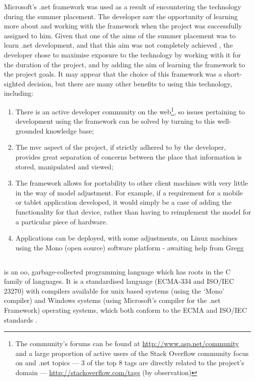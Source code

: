 Microsoft's .\gls{net} framework was used as a result of encountering the technology during the summer placement.  The developer saw the opportunity of learning more about and working with the framework when the project was successfully assigned to him.  Given that one of the aims of the summer placement was to learn .\gls{net} development, and that this aim was not completely achieved \cite{summerPlacementReport}, the developer chose to maximise exposure to the technology by working with it for the duration of the project, and by adding the aim of learning the framework to the project goals.  It may appear that the choice of this framework was a short-sighted decision, but there are many other benefits to using this technology, including:
\begin{enumerate}
	\item There is an active developer community on the web\footnote{The community's forums can be found at \url{http://www.asp.net/community} and a large proportion of active users of the Stack Overflow community focus on \cs and .\gls{net} topics --- 3 of the top 8 tags are directly related to the project's domain --- \url{http://stackoverflow.com/tags} (by observation)}, so issues pertaining to development using the framework can be solved by turning to this well-grounded knowledge base;
	\item The \gls{mvc} aspect of the project, if strictly adhered to by the developer, provides great separation of concerns between the place that information is stored, manipulated and viewed;
	\item The framework allows for portability to other client machines with very little in the way of model adjustment. For example, if a requirement for a mobile or tablet application developed, it would simply be a case of adding the functionality for that device, rather than having to reimplement the model for a particular piece of hardware.
	\item Applications can be deployed, with some adjustments, on Linux machines using the Mono (open source) software platform \revisit - awaiting help from Gregg
\end{enumerate}

\subsection{\cs}
\label{csharpDiscussion}
\cs is an \gls{oo}, garbage-collected programming language which has roots in the C family of languages.  It is a standardised language (ECMA-334 and ISO/IEC 23270) with compilers available for unix based systems (using the `Mono' compiler) and Windows systems (using Microsoft's \cs compiler for the .\gls{net} Framework) operating systems, which both conform to the ECMA and ISO/IEC standards \cite{monoStandardised} \cite{csPL}.

